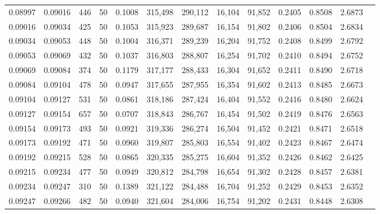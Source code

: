 \begin{tabular}{rrrrrrrrrrrrr}
0.08997 & 0.09016 &   446 &  50 &                                     0.1008 & 315,498 & 290,112 &  16,104 &  91,852 & 0.2405 & 0.8508 & 2.6873 \\
0.09016 & 0.09034 &   425 &  50 &                                     0.1053 & 315,923 & 289,687 &  16,154 &  91,802 & 0.2406 & 0.8504 & 2.6834 \\
0.09034 & 0.09053 &   448 &  50 &                                     0.1004 & 316,371 & 289,239 &  16,204 &  91,752 & 0.2408 & 0.8499 & 2.6792 \\
0.09053 & 0.09069 &   432 &  50 &                                     0.1037 & 316,803 & 288,807 &  16,254 &  91,702 & 0.2410 & 0.8494 & 2.6752 \\
0.09069 & 0.09084 &   374 &  50 &                                     0.1179 & 317,177 & 288,433 &  16,304 &  91,652 & 0.2411 & 0.8490 & 2.6718 \\
0.09084 & 0.09104 &   478 &  50 &                                     0.0947 & 317,655 & 287,955 &  16,354 &  91,602 & 0.2413 & 0.8485 & 2.6673 \\
0.09104 & 0.09127 &   531 &  50 &                                     0.0861 & 318,186 & 287,424 &  16,404 &  91,552 & 0.2416 & 0.8480 & 2.6624 \\
0.09127 & 0.09154 &   657 &  50 &                                     0.0707 & 318,843 & 286,767 &  16,454 &  91,502 & 0.2419 & 0.8476 & 2.6563 \\
0.09154 & 0.09173 &   493 &  50 &                                     0.0921 & 319,336 & 286,274 &  16,504 &  91,452 & 0.2421 & 0.8471 & 2.6518 \\
0.09173 & 0.09192 &   471 &  50 &                                     0.0960 & 319,807 & 285,803 &  16,554 &  91,402 & 0.2423 & 0.8467 & 2.6474 \\
0.09192 & 0.09215 &   528 &  50 &                                     0.0865 & 320,335 & 285,275 &  16,604 &  91,352 & 0.2426 & 0.8462 & 2.6425 \\
0.09215 & 0.09234 &   477 &  50 &                                     0.0949 & 320,812 & 284,798 &  16,654 &  91,302 & 0.2428 & 0.8457 & 2.6381 \\
0.09234 & 0.09247 &   310 &  50 &                                     0.1389 & 321,122 & 284,488 &  16,704 &  91,252 & 0.2429 & 0.8453 & 2.6352 \\
0.09247 & 0.09266 &   482 &  50 &                                     0.0940 & 321,604 & 284,006 &  16,754 &  91,202 & 0.2431 & 0.8448 & 2.6308 \\

\end{tabular}
